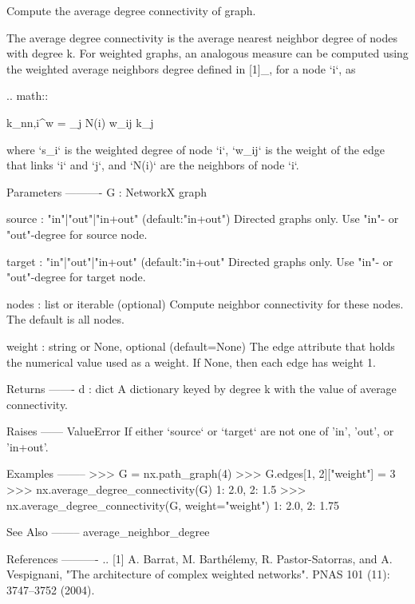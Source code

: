 \begin{DoxyVerb}Compute the average degree connectivity of graph.

The average degree connectivity is the average nearest neighbor degree of
nodes with degree k. For weighted graphs, an analogous measure can
be computed using the weighted average neighbors degree defined in
[1]_, for a node `i`, as

.. math::

    k_{nn,i}^{w} =  \sum_{j \in N(i)} w_{ij} k_j

where `s_i` is the weighted degree of node `i`,
`w_{ij}` is the weight of the edge that links `i` and `j`,
and `N(i)` are the neighbors of node `i`.

Parameters
----------
G : NetworkX graph

source :  "in"|"out"|"in+out" (default:"in+out")
   Directed graphs only. Use "in"- or "out"-degree for source node.

target : "in"|"out"|"in+out" (default:"in+out"
   Directed graphs only. Use "in"- or "out"-degree for target node.

nodes : list or iterable (optional)
    Compute neighbor connectivity for these nodes. The default is all
    nodes.

weight : string or None, optional (default=None)
   The edge attribute that holds the numerical value used as a weight.
   If None, then each edge has weight 1.

Returns
-------
d : dict
   A dictionary keyed by degree k with the value of average connectivity.

Raises
------
ValueError
    If either `source` or `target` are not one of 'in',
    'out', or 'in+out'.

Examples
--------
>>> G = nx.path_graph(4)
>>> G.edges[1, 2]["weight"] = 3
>>> nx.average_degree_connectivity(G)
{1: 2.0, 2: 1.5}
>>> nx.average_degree_connectivity(G, weight="weight")
{1: 2.0, 2: 1.75}

See Also
--------
average_neighbor_degree

References
----------
.. [1] A. Barrat, M. Barthélemy, R. Pastor-Satorras, and A. Vespignani,
   "The architecture of complex weighted networks".
   PNAS 101 (11): 3747–3752 (2004).
\end{DoxyVerb}
 \mbox{\label{namespacenetworkx_1_1algorithms_1_1assortativity_1_1connectivity_a80631f000db4c5d03bd4c66601addd35}} 
